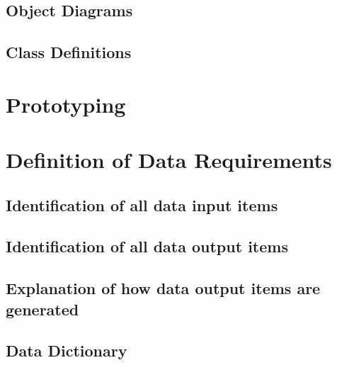 \subsection{Object Diagrams}

\subsection{Class Definitions}

\section{Prototyping}

\section{Definition of Data Requirements}

\subsection{Identification of all data input items}

\subsection{Identification of all data output items}

\subsection{Explanation of how data output items are generated}

\subsection{Data Dictionary}

